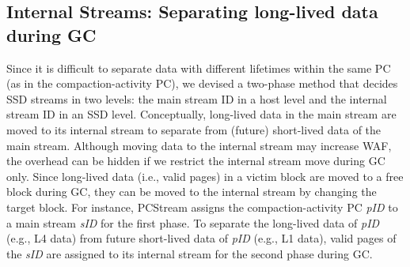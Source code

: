 \subsection{Internal Streams: Separating long-lived data during GC}
Since it is difficult to separate data with different lifetimes within the same PC 
(as in the compaction-activity PC), we devised a two-phase method that decides SSD 
streams in two levels: the main stream ID in a host level and the internal stream ID in an SSD level.
Conceptually, long-lived data in the main stream are moved to its internal stream to 
separate from (future) short-lived data of the main stream.
Although moving data to the internal stream may increase WAF,
the overhead can be hidden if we restrict the internal stream move during GC only.
Since long-lived data (i.e., valid pages) in a victim block are moved to a free block during GC, 
they can be moved to the internal stream by changing the target block.
For instance, \textsf{\small PCStream} assigns the compaction-activity PC {\it pID} to a
main stream {\it sID} for the first phase.
To separate the long-lived data of {\it pID} (e.g., L4 data) 
from future short-lived data of {\it pID} (e.g., L1 data), 
valid pages of the {\it sID} are assigned to its internal stream for the second phase during GC.



